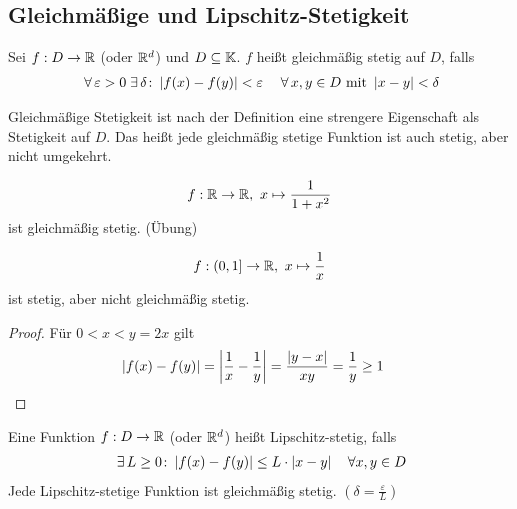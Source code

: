 \subsection{Gleichmäßige und Lipschitz-Stetigkeit}
\thispagestyle{pagenumberonly}

\begin{definition} %
    Sei $f: D\rightarrow{} \mathbb{R}$ (oder $\mathbb{R}^d$) und $D\subseteq\mathbb{K}$. $f$ heißt gleichmäßig stetig auf $D$, falls
    \begin{align*}
        \;\forall\,\varepsilon > 0\;\exists\,\delta\colon \left\lvert f(x)-f(y)\right\rvert < \varepsilon\quad\;\forall\, x,y\in D \text{ mit } \left\lvert x-y\right\rvert < \delta
    \end{align*}
\end{definition}

\begin{bemerkung}
    Gleichmäßige Stetigkeit ist nach der Definition eine strengere Eigenschaft als Stetigkeit auf $D$. Das heißt jede gleichmäßig stetige Funktion ist auch stetig, aber nicht umgekehrt.
\end{bemerkung}

\begin{beispiel}
    \begin{align*}
        f: \mathbb{R}\rightarrow{}\mathbb{R},~x\mapsto\frac{1}{1+x^2}
    \end{align*}
    ist gleichmäßig stetig. (Übung)
\end{beispiel}
\begin{beispiel}
    \begin{align*}
        f: \left(0,1\right]\rightarrow{} \mathbb{R},~x\mapsto \frac{1}{x}
    \end{align*}
    ist stetig, aber nicht gleichmäßig stetig.
    \begin{proof}
        Für $0 < x < y = 2x$ gilt
        \begin{align*}
            \left\lvert f(x)-f(y)\right\rvert &= \left\lvert\frac{1}{x} - \frac{1}{y}\right\rvert = \frac{\left\lvert y-x\right\rvert}{xy} = \frac{1}{y}\geq 1\qedhere
        \end{align*}
    \end{proof}
\end{beispiel}

\begin{definition}
    Eine Funktion $f: D\rightarrow{}\mathbb{R}$ (oder $\mathbb{R}^d$) heißt Lipschitz-stetig, falls
    \begin{align*}
        \;\exists\, L\geq 0\colon \left\lvert f(x)-f(y)\right\rvert \leq L\cdot\left\lvert x-y\right\rvert\quad\forall x,y\in D
    \end{align*}
    Jede Lipschitz-stetige Funktion ist gleichmäßig stetig. $(\delta = \frac{\varepsilon}{L})$
\end{definition}

